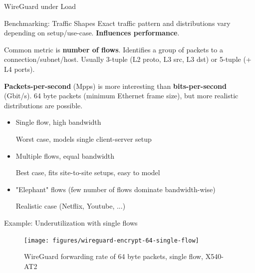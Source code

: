 \documentclass[NET,english]{tumbeamer}
\begin{document}
\begin{frame}{WireGuard under Load}

\end{frame}

\begin{frame}{Benchmarking: Traffic Shapes}
Exact traffic pattern and distributions vary depending on setup/use-case.
\textbf{Influences performance}.

Common metric is \textbf{number of flows}. Identifies a group of packets to a connection/subnet/host. Usually 3-tuple (L2 proto, L3 src, L3 dst) or 5-tuple (+ L4 ports).

\textbf{Packets-per-second} (Mpps) is more interesting than \textbf{bits-per-second} (Gbit/s). 64 byte packets (minimum Ethernet frame size), but more realistic distributions are possible.

\vspace*{-0.5em}
\begin{itemize}
	\item Single flow, high bandwidth
	
	Worst case, models single client-server setup
	
	\item Multiple flows, equal bandwidth
	
	Best case, fits site-to-site setups, easy to model
	
	\item "Elephant" flows (few number of flows dominate bandwidth-wise)
		
	Realistic case (Netflix, Youtube, ...)
\end{itemize}
\end{frame}

\begin{frame}{Example: Underutilization with single flows}
\begin{figure}
	\texttt{[image: figures/wireguard-encrypt-64-single-flow]}
	\caption{WireGuard forwarding rate of 64 byte packets, single flow, X540-AT2}
	\label{fig:wireguard-encrypt-64-single-flow}
\end{figure}


\end{frame}
\end{document}
